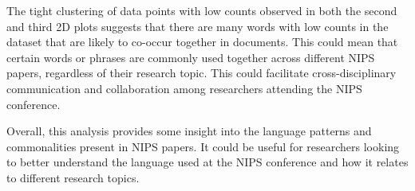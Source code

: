 \documentclass{article}
\begin{document}
The tight clustering of data points with low counts observed in both the second and third 2D plots suggests that there are many words with low counts in the dataset that are likely to co-occur together in documents. This could mean that certain words or phrases are commonly used together across different NIPS papers, regardless of their research topic. This could facilitate cross-disciplinary communication and collaboration among researchers attending the NIPS conference.

Overall, this analysis provides some insight into the language patterns and commonalities present in NIPS papers. It could be useful for researchers looking to better understand the language used at the NIPS conference and how it relates to different research topics.




\end{document}
